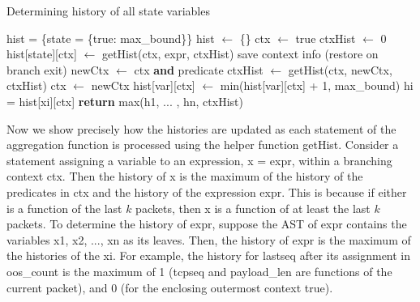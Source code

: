 \begin{small}
\begin{algorithm}
  \caption{Determining history of all state variables}
  \label{alg:history}
  \begin{algorithmic}[1]
    \State hist = \{state = \{true: max\_bound\}\}  \label{line:curr-hist-init}
    \label{line:computeHistoryStart}
     \label{line:fixed-point}
    \State hist $\gets$ \{\}
    \State ctx $\gets$ true 
    \State ctxHist $\gets$ 0 
     \label{line:stmt-iteration} \label{line:fp-agg-begin}
    \State hist[state][ctx] $\gets$ {\sc getHist}(ctx, expr,
    ctxHist) \label{line:stmt-history-update}
    \label{line:encounter-branching}
    \State save context info (restore on branch exit)\label{line:branch-ctx-update-start}
    \State newCtx $\gets$ ctx \textbf{and} predicate
    \State ctxHist $\gets$ {\sc getHist}(ctx, newCtx, ctxHist)
    \State ctx $\gets$ newCtx\label{line:branch-ctx-update-end}
    \EndIf
    \EndFor \label{line:fp-agg-end}
    \State hist[var][ctx] $\gets$ min(hist[var][ctx] + 1, max\_bound)\label{line:inc}
    \EndFor
    \EndWhile \label{line:fixed-point-end}
    \EndFunction
    \label{line:used-var-start}
    \State hi = hist[{\cta xi}][ctx]
    \EndFor\label{line:used-var-end}
    \State \textbf{return} max(h1, ... , hn, ctxHist) \label{line:assign-max-hist}
    \EndFunction
  \end{algorithmic}
\end{algorithm}
\end{small}

Now we show precisely how the histories are updated as each statement of the
aggregation function is processed using the helper function {\sc getHist}.
Consider a statement assigning a variable to an expression, {\ct x = expr},
within a branching context {\ct ctx}. Then the history of {\ct x} is the
maximum of the history of the predicates in {\ct ctx} and the history of the
expression {\ct expr}. This is because if either is a function of the last $k$
packets, then {\ct x} is a function of at least the last $k$ packets.  To
determine the history of {\ct expr}, suppose the AST of {\ct expr} contains the
variables {\ct x1, x2, ..., xn} as its leaves. Then, the history of {\ct expr}
is the maximum of the histories of the {\ct xi}.  For example, the history for
{\ct lastseq} after its assignment in {\ct oos\_count} is the maximum of 1
({\ct tcpseq} and {\ct payload\_len} are functions of the current packet), and
0 (for the enclosing outermost context {\ct true}).

